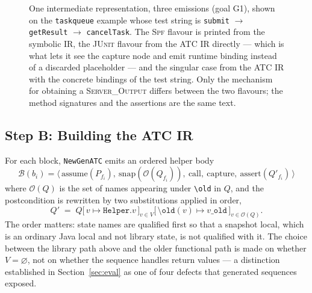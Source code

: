 \documentclass[conference]{IEEEtran}
\begin{document}
\begin{figure}[htbp]
{}
    \caption{One intermediate representation, three emissions (goal G1), shown on the
    \texttt{taskqueue} example whose test string is \texttt{submit} $\rightarrow$
    \texttt{getResult} $\rightarrow$ \texttt{cancelTask}. The \textsc{Spf} flavour is
    printed from the symbolic IR, the \textsc{JUnit} flavour from the ATC IR directly
    --- which is what lets it see the capture node and emit runtime binding instead of a
    discarded placeholder --- and the singular case from the ATC IR with the concrete
    bindings of the test string. Only the mechanism for obtaining a
    \textsc{Server\_Output} differs between the two flavours; the method signatures
    and the assertions are the same text.}
    \label{fig:dual}
\end{figure}

\subsection{Step B: Building the ATC IR}

For each block, \texttt{NewGenATC} emits an ordered helper body
\begin{equation}
\mathcal{B}(b_i)=\big\langle\,
\mathrm{assume}(P_{f_i}),\
\mathrm{snap}(\mathcal{O}(Q_{f_i})),\
\mathrm{call},\
\mathrm{capture},\
\mathrm{assert}(Q'_{f_i})
\,\big\rangle
\end{equation}
where $\mathcal{O}(Q)$ is the set of names appearing under
\texttt{\textbackslash old} in $Q$, and the postcondition is rewritten by two
substitutions applied in order,
\begin{equation}
Q' \;=\; Q\big[\,v\mapsto\texttt{Helper.}v\,\big]_{v\in V}
         \big[\,\texttt{\textbackslash old}(v)\mapsto v\_\texttt{old}\,\big]_{v\in\mathcal{O}(Q)} .
\end{equation}
The order matters: state names are qualified first so that a snapshot local, which
is an ordinary Java local and not library state, is not qualified with it. The
choice between the library path above and the older functional path is made on
whether $V=\varnothing$, not on whether the sequence handles return values ---
a distinction established in Section~\ref{sec:eval} as one of four defects that
generated sequences exposed.
\end{document}
